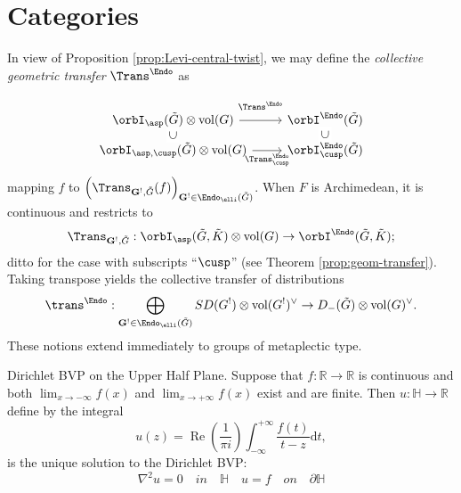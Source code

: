\documentclass[11pt, a3paper, openany]{article}
\newcommand{\mes}{\operatorname{vol}}
\theoremstyle{remark}
\newtheorem{remark}[]{\bfseries Remark}          %
\theoremstyle{remark}
\theoremstyle{remark}
\newenvironment{Proof of claim}
  {\begin{proof}[\normalfont \textbf{Proof of claim}]}
  {\end{proof}}
\begin{document}
\section{Categories}
\begin{Definition}
	In view of Proposition \ref{prop:Levi-central-twist}, we may define the \emph{collective geometric transfer} $\Trans^{\Endo}$ as
	\begin{equation*}\begin{tikzcd}[row sep=tiny]
		\orbI_{\asp}(\tilde{G}) \otimes \mes(G) \arrow[r, "{\Trans^{\Endo}}" inner sep=0.8em] & \orbI^{\Endo}(\tilde{G}) \\
		\orbI_{\asp, \cusp}(\tilde{G}) \otimes \mes(G) \arrow[phantom, u, "\subset" description, sloped] \arrow[r, "{\Trans^{\Endo}_{\cusp}}"'] & \orbI^{\Endo}_{\cusp}(\tilde{G}) \arrow[phantom, u, "\subset" description, sloped]
	\end{tikzcd}\end{equation*}mapping $f$ to $\left( \Trans_{\mathbf{G}^!, \tilde{G}}(f)\right)_{\mathbf{G}^! \in \Endo_{\elli}(\tilde{G})}$. When $F$ is Archimedean, it is continuous and restricts to
	\[ \Trans_{\mathbf{G}^!, \tilde{G}}: \orbI_{\asp}(\tilde{G}, \tilde{K}) \otimes \mes(G) \to \orbI^{\Endo}(\tilde{G}, \tilde{K}); \]
	ditto for the case with subscripts ``$\cusp$'' (see Theorem \ref{prop:geom-transfer}).
	Taking transpose yields the collective transfer of distributions
	\[ \trans^{\Endo}: \bigoplus_{\mathbf{G}^! \in \Endo_{\elli}(\tilde{G})} SD(G^!) \otimes \mes(G^!)^\vee \to D_-(\tilde{G}) \otimes \mes(G)^\vee . \]
These notions extend immediately to groups of metaplectic type.
\end{Definition}

\begin{Proposition}{Dirichlet BVP on the Upper Half Plane.}{}
Suppose that $f: \mathbb{R} \rightarrow \mathbb{R}$ is continuous and both $\lim_{x \to -\infty} f(x) $ and $\lim_{x \to +\infty} f(x) $ exist and are finite. Then $u: \mathbb{H} \rightarrow \mathbb{R}$ define by the integral 
$$ u(z) = \operatorname{Re}(\frac{1}{\pi i}) \int_{-\infty}^{+\infty} \frac{f(t)}{t-z}\mathrm{d}t, $$ is the unique solution to the Dirichlet BVP:$$\nabla^{2}u=0 \quad in \quad \mathbb{H} \quad u=f \quad on \quad \partial \mathbb{H} $$
\end{Proposition}
\end{document}
